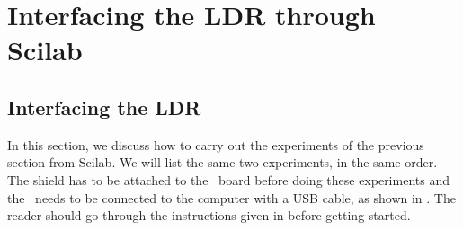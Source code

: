 \section{Interfacing the LDR through Scilab}
\subsection{Interfacing the LDR}
In this section, we discuss how to carry out the experiments of the
previous section from Scilab. We will list the same two experiments,
in the same order.  The shield has to be attached to the \arduino\ board
before doing these experiments and the \arduino\ needs to be connected to the computer 
with a USB cable, as shown in .
The reader should go through the instructions given in
 before getting started. 


